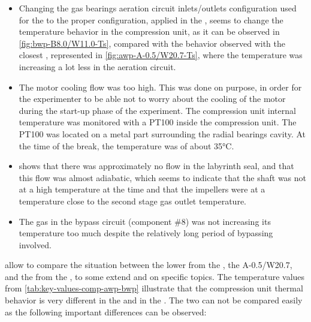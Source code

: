 \begin{itemize}
\item Changing the gas bearings aeration circuit inlets/outlets
  configuration used for the \AWP{} to the proper configuration,
  applied in the \BWP{}, seems to change the temperature behavior in
  the compression unit, as it can be observed in
  \cref{fig:bwp-B8.0/W11.0-Ts}, compared with the behavior observed
  with the closest \AWP{} \OP, represented in
  \cref{fig:awp-A-0.5/W20.7-Ts}, where the temperature was increasing
  a lot less in the aeration circuit.
\item The motor cooling flow was too high. This was done on purpose,
  in order for the experimenter to be able not to worry about the
  cooling of the motor during the start-up phase of the
  experiment. The compression unit internal temperature was monitored
  with a PT100 inside the compression unit. The PT100 was located on a
  metal part surrounding the radial bearings cavity. At the time of
  the break, the temperature was of about
  35\si{\degreeCelsius}.
\item {} shows that there was approximately
  no flow in the labyrinth seal, and that
  this flow was almost adiabatic, which seems to indicate that the
  shaft was not at a high temperature at the time and that the
  impellers were at a temperature close to the second stage gas outlet
  temperature.
\item The gas in the bypass circuit (component \#8) was not increasing
  its temperature too much despite the relatively long period of
  bypassing involved.
\end{itemize}

allow to compare the situation between the lower \OP{} from the \AWP{}
, the \OP{} A-0.5/W20.7, and the \OP{} from the \BWP{}, to some extend
and on specific topics. The temperature values from
\cref{tab:key-values-comp-awp-bwp} illustrate that the compression
unit thermal behavior is very different in the \BWP{} and in the
\AWP{}. The two \OP{} can not be compared easily as the following
important differences can be observed:

